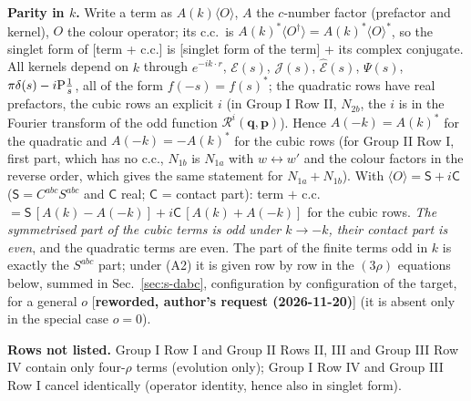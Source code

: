 {\noindent\textbf{Parity in $k$.} Write a term as $A(k)\langle O\rangle$, $A$ the $c$-number factor (prefactor and kernel), $O$ the colour operator; its c.c.\ is $A(k)^{*}\langle O^{\dagger}\rangle=A(k)^{*}\langle O\rangle^{*}$, so the singlet form of [term + c.c.] is [singlet form of the term] + its complex conjugate. All kernels depend on $k$ through $e^{-ik\cdot r}$, $\mathcal{E}(s)$, $\mathcal{J}(s)$, $\widehat{\mathcal{E}}(s)$, $\Psi(s)$, $\pi\delta(s)-i{\rm P}\frac1s$, all of the form $f(-s)=f(s)^{*}$; the quadratic rows have real prefactors, the cubic rows an explicit $i$ (in Group I Row II, $N_{2b}$, the $i$ is in the Fourier transform of the odd function $\mathcal{R}^{i}(\mathbf{q},\mathbf{p})$). Hence $A(-k)=A(k)^{*}$ for the quadratic and $A(-k)=-A(k)^{*}$ for the cubic rows (for Group II Row I, first part, which has no c.c., $N_{1b}$ is $N_{1a}$ with $w\leftrightarrow w'$ and the colour factors in the reverse order, which gives the same statement for $N_{1a}+N_{1b}$). With $\langle O\rangle=\mathsf{S}+i\mathsf{C}$ ($\mathsf{S}=C^{abc}S^{abc}$ and $\mathsf{C}$ real; $\mathsf{C}$ = contact part): term $+$ c.c.\ $=\mathsf{S}\,[A(k)-A(-k)]+i\mathsf{C}\,[A(k)+A(-k)]$ for the cubic rows. \emph{The symmetrised part of the cubic terms is odd under $k\to-k$, their contact part is even}, and the quadratic terms are even. The part of the finite terms odd in $k$ is exactly the $S^{abc}$ part; under (A2) it is given row by row in the $(3\rho)$ equations below, summed in Sec.~\ref{sec:s-dabc}, configuration by configuration of the target, for a general $o$ [\textbf{reworded, author's request (2026-11-20)}] (it is absent only in the special case $o=0$).

\noindent\textbf{Rows not listed.} Group I Row I and Group II Rows II, III and Group III Row IV contain only four-$\rho$ terms (evolution only); Group I Row IV and Group III Row I cancel identically (operator identity, hence also in singlet form).

}
